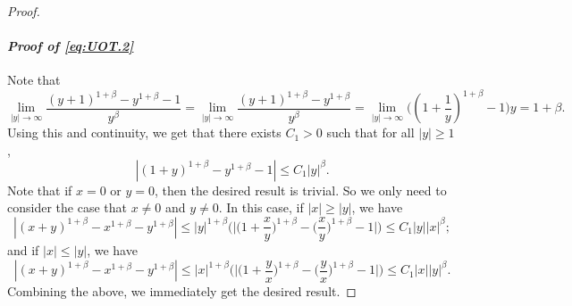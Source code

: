 \documentclass[12pt,a4paper]{amsart}
\theoremstyle{plain}
\theoremstyle{definition}
\numberwithin{equation}{section}
\begin{document}
\begin{proof}
\paragraph{\it Proof of \eqref{eq:UOT.2}}
   Note that
\[
\lim_{|y|\rightarrow \infty}\frac{(y+1)^{1+\beta}-y^{1+\beta}-1}{y^{\beta}}=\lim_{|y|\rightarrow \infty}\frac{(y+1)^{1+\beta}-y^{1+\beta}}{y^{\beta}}=\lim_{|y|\rightarrow \infty}\big((1+\frac{1}{y})^{1+\beta}-1\big)y = 1+\beta.
\]
Using this and continuity, we get that there exists $C_1>0$ such that for all $|y|\geq 1$,
\[
|(1+y)^{1+\beta}-y^{1+\beta}-1|\leq C_1 |y|^{\beta}.
\]
Note that if $x = 0$ or $y= 0$, then the desired result is trivial.
So we only need to consider
the case that $x \neq 0$ and $y \neq 0$.
In this case, if $|x|\geq |y|$, we have
\[
|(x+y)^{1+\beta}-x^{1+\beta}-y^{1+\beta}|\leq |y|^{1+\beta}\bigg(\Big|\Big(1+\frac{x}{y}\Big)^{1+\beta}-\Big(\frac{x}{y}\Big)^{1+\beta}-1\Big|\bigg)\leq C_1|y||x|^{\beta};
\]
and  if $|x|\leq |y|$, we have
\[
|(x+y)^{1+\beta}-x^{1+\beta}-y^{1+\beta}|
\leq |x|^{1+\beta}\bigg( \Big| \Big(1+\frac{y}{x}\Big)^{1+\beta}-\Big(\frac{y}{x}\Big)^{1+\beta}-1\Big|\bigg)\leq C_1|x||y|^{\beta}.
\]
Combining the above, we immediately get the desired result.
\end{proof}
\end{document}
